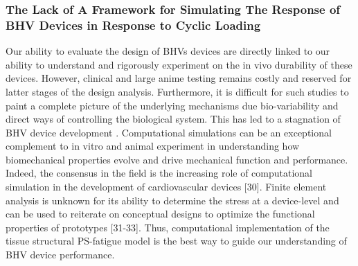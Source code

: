 \subsubsection{The Lack of A Framework for Simulating The Response of BHV Devices in Response to Cyclic Loading}

    Our ability to evaluate the design of BHVs devices are directly linked to our ability to understand and rigorously experiment on the in vivo durability of these devices. However, clinical and large anime testing remains costly and reserved for latter stages of the design analysis. Furthermore, it is difficult for such studies to paint a complete picture of the underlying mechanisms due bio-variability and direct ways of controlling the biological system. This has led to a stagnation of BHV device development \cite{schoen_cardiac_2005}. Computational simulations can be an exceptional complement to in vitro and animal experiment in understanding how biomechanical properties evolve and drive mechanical function and performance. Indeed, the consensus in the field is the increasing role of computational simulation in the development of cardiovascular devices [30]. Finite element analysis is unknown for its ability to determine the stress at a device-level and can be used to reiterate on conceptual designs to optimize the functional properties of prototypes [31-33]. Thus, computational implementation of the tissue structural PS-fatigue model is the best way to guide our understanding of BHV device performance.
